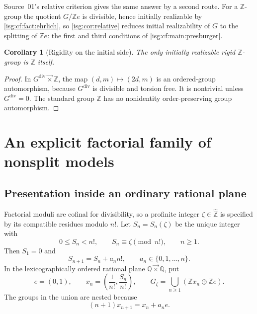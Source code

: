 \documentclass[11pt]{article}
\newtheorem{corollary}[corollary]{Corollary}
\theoremstyle{definition}
\theoremstyle{remark}
\newcommand{\Z}{\mathbb{Z}}
\newcommand{\lex}{\mathbin{\overrightarrow{\times}}}
\newcommand{\Q}{\mathbb{Q}}
\newcommand{\Zhat}{\widehat{\Z}}
\newcommand{\dv}{\mathrm{div}}
\begin{document}
Source~01's relative criterion gives the same answer by a second route.
For a $\Z$-group the quotient $G/\Z e$ is divisible, hence initially
realizable by \cref{isg:cf:fact:ehrlich}, so \cref{isg:cor:relative}
reduces initial realizability of $G$ to the splitting of $\Z e$: the
first and third conditions of \cref{isg:cf:main:presburger}.

\begin{corollary}[Rigidity on the initial side]\label{isg:cf:cor:rigidityinitial}
The only initially realizable rigid $\Z$-group is $\Z$ itself.
\end{corollary}
\begin{proof}
In $G^{\dv}\lex\Z$, the map $(d,m)\mapsto(2d,m)$ is an ordered-group
automorphism, because $G^{\dv}$ is divisible and torsion free. It is
nontrivial unless $G^{\dv}=0$. The standard group $\Z$ has no nonidentity
order-preserving group automorphism.
\end{proof}

\section{An explicit factorial family of nonsplit models}\label{isg:cf:sec:factorial}

\subsection{Presentation inside an ordinary rational plane}
Factorial moduli are cofinal for divisibility, so a profinite integer
$\zeta\in\Zhat$ is specified by its compatible residues modulo $n!$.
Let $S_n=S_n(\zeta)$ be the unique integer with
\[
 0\le S_n<n!,\qquad S_n\equiv\zeta\pmod{n!},\qquad n\ge1.
\]
Then $S_1=0$ and
\begin{equation}\label{isg:cf:eq:digits}
 S_{n+1}=S_n+a_n n!,\qquad a_n\in\{0,1,\ldots,n\}.
\end{equation}
In the lexicographically ordered rational plane $\Q\lex\Q$, put
\begin{equation}\label{isg:cf:eq:groupfamily}
 e=(0,1),\qquad
 x_n=\left(\frac1{n!},\frac{S_n}{n!}\right),\qquad
 G_\zeta=\bigcup_{n\ge1}(\Z x_n\oplus\Z e).
\end{equation}
The groups in the union are nested because
\begin{equation}\label{isg:cf:eq:transition}
 (n+1)x_{n+1}=x_n+a_n e.
\end{equation}
\end{document}

